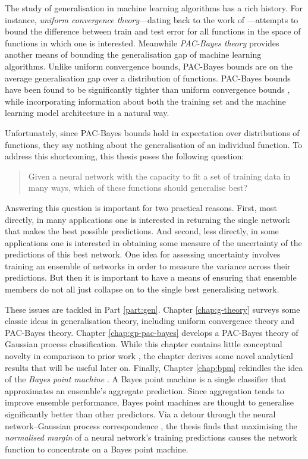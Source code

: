 \begin{refsection}
The study of generalisation in machine learning algorithms has a rich history. For instance, \textit{uniform convergence theory}---dating back to the work of \citet{vcpaper}---attempts to bound the difference between train and test error for all functions in the space of functions in which one is interested. Meanwhile \textit{PAC-Bayes theory} \citep{mcallester1999some} provides another means of bounding the generalisation gap of machine learning algorithms. Unlike uniform convergence bounds, PAC-Bayes bounds are on the average generalisation gap over a distribution of functions. PAC-Bayes bounds have been found to be significantly tighter than uniform convergence bounds \citep{seeger}, while incorporating information about both the training set and the machine learning model architecture in a natural way.

Unfortunately, since PAC-Bayes bounds hold in expectation over distributions of functions, they say nothing about the generalisation of an individual function. To address this shortcoming, this thesis poses the following question:

\begin{quote}
    Given a neural network with the capacity to fit a set of training data in many ways, which of these functions should generalise best?
\end{quote}
    
Answering this question is important for two practical reasons. First, most directly, in many applications one is interested in returning the single network that makes the best possible predictions. And second, less directly, in some applications one is interested in obtaining some measure of the uncertainty of the predictions of this best network. One idea for assessing uncertainty involves training an ensemble of networks in order to measure the variance across their predictions. But then it is important to have a means of ensuring that ensemble members do not all just collapse on to the single best generalising network.

These issues are tackled in Part \ref{part:gen}. Chapter \ref{chap:g-theory} surveys some classic ideas in generalisation theory, including uniform convergence theory and PAC-Bayes theory. Chapter \ref{chap:gp-pac-bayes} develops a PAC-Bayes theory of Gaussian process classification. While this chapter contains little conceptual novelty in comparison to prior work \citep{seeger}, the chapter derives some novel analytical results that will be useful later on. Finally, Chapter \ref{chap:bpm} rekindles the idea of the \textit{Bayes point machine} \citep{bpms}. A Bayes point machine is a single classifier that approximates an ensemble's aggregate prediction. Since aggregation tends to improve ensemble performance, Bayes point machines are thought to generalise significantly better than other predictors. Via a detour through the neural network--Gaussian process correspondence \citep{radford}, the thesis finds that maximising the \textit{normalised margin} of a neural network's training predictions causes the network function to concentrate on a Bayes point machine.


\end{refsection}
